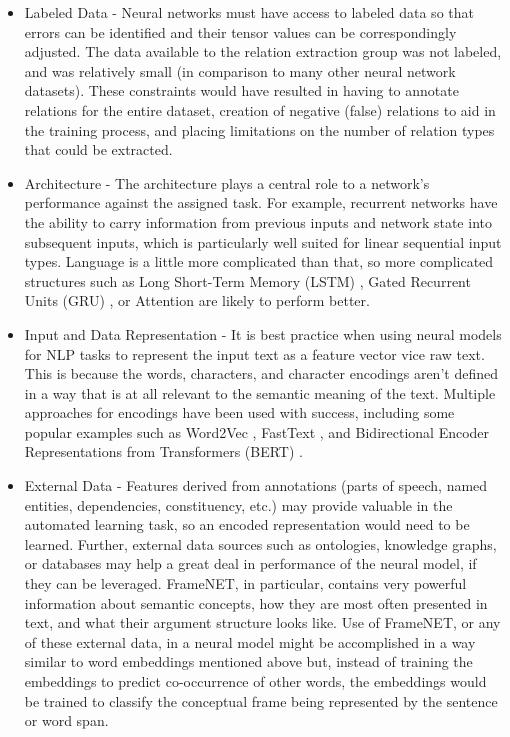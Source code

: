 \documentclass[11pt,letterpaper]{article}
\begin{document}
\begin{itemize}
    
    \item Labeled Data - Neural networks must have access to labeled data so that errors can be identified and their tensor values can be correspondingly adjusted.  The data available to the relation extraction group was not labeled, and was relatively small (in comparison to many other neural network datasets).  These constraints would have resulted in having to annotate relations for the entire dataset, creation of negative (false) relations to aid in the training process, and placing limitations on the number of relation types that could be extracted.
    
    \item Architecture - The architecture plays a central role to a network's performance against the assigned task.  For example, recurrent networks have the ability to carry information from previous inputs and network state into subsequent inputs, which is particularly well suited for linear sequential input types.  Language is a little more complicated than that, so more complicated structures such as Long Short-Term Memory (LSTM) \cite{article}, Gated Recurrent Units (GRU) \cite{DBLP:journals/corr/ChoMGBSB14}, or Attention \cite{bahdanau2014neural} are likely to perform better.
    
    \item Input and Data Representation - It is best practice when using neural models for NLP tasks to represent the input text as a feature vector vice raw text.  This is because the words, characters, and character encodings aren't defined in a way that is at all relevant to the semantic meaning of the text.  Multiple approaches for encodings have been used with success, including some popular examples such as Word2Vec \cite{mikolov2015computing}, FastText \cite{DBLP:journals/corr/JoulinGBDJM16}, and Bidirectional Encoder Representations from Transformers (BERT) \cite{DBLP:journals/corr/abs-1810-04805}.  
    
    \item External Data - Features derived from annotations (parts of speech, named entities, dependencies, constituency, etc.) may provide valuable in the automated learning task, so an encoded representation would need to be learned.  Further, external data sources such as ontologies, knowledge graphs, or databases may help a great deal in performance of the neural model, if they can be leveraged.  FrameNET, in particular, contains very powerful information about semantic concepts, how they are most often presented in text, and what their argument structure looks like.  Use of FrameNET, or any of these external data, in a neural model might be accomplished in a way similar to word embeddings mentioned above but, instead of training the embeddings to predict co-occurrence of other words, the embeddings would be trained to classify the conceptual frame being represented by the sentence or word span.
    
\end{itemize}
\end{document}
